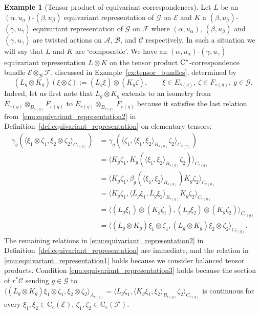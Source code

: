 \documentclass[11 pt, leqno]{amsart}
\numberwithin{equation}{section}
\theoremstyle{plain}
\theoremstyle{definition}
\newtheorem{ex}[thm]{Example}
\newcommand*{\contc}{\mathrm{C_c}}%
\newcommand{\B}{\mathcal B}
\newcommand{\G}{\mathcal G} %
\newcommand{\CC}{\mathcal C}
\newcommand{\EE}{\mathcal E}
\newcommand{\FF}{\mathcal F}
\newcommand{\A}{\mathcal A}
\newcommand{\cst}{\ifmmode\mathrm{C}^*\else{$\mathrm{C}^*$}\fi}
\begin{document}
\begin{ex}[Tensor product of equivariant correspondences] \label{ex:tensor_product_groupoid_actions}
Let $L$ be an $(\alpha, u_{\alpha})$-$(\beta,u_{\beta})$ equivariant representation of $\G$ on $\EE$  and $K$ a $(\beta,u_{\beta})$-$(\gamma, u_{\gamma})$ equivariant representation of $\G$ on $\FF$ where $(\alpha, u_{\alpha})$, $(\beta,u_{\beta})$ and $(\gamma, u_{\gamma})$ are twisted actions on  $\A$, $\B$, and  $\CC$ respectively. 
In such a situation we will say that $L$ and $K$ are `composable'. 
We have an $(\alpha, u_{\alpha})$-$(\gamma, u_{\gamma})$ equivariant representation $L \otimes K$ on the tensor product $\cst$-correspondence bundle $\EE\otimes_{\B} \FF$,
discussed in Example~\ref{ex:tensor_bundles}, determined by 
\[
    (L_g\otimes K_g )(\xi\otimes \zeta) := (L_g\xi)\otimes (K_g \zeta), \qquad \xi \in E_{s(g)},\ \zeta\in  F_{s(g)},\ g \in \G.
\]
Indeed, let us first note that $L_g\otimes K_g$ extends to an isometry from $E_{s(g)}\otimes_{B_{s(g)}} F_{s(g)}$ to $E_{r(g)}\otimes_{B_{r(g)}} F_{r(g)}$ because it satisfies the last relation from~\ref{enu:equivariant_representation2} in Definition~\ref{def:equivariant_representation} on elementary tensors:
\[
\begin{split}
    \gamma_{g}(  \langle\xi_1\otimes \zeta_1,  \xi_2\otimes \zeta_2\rangle_{C_{s(g)}}) &=\gamma_{g}(  \langle \zeta_1,  \langle \xi_1,\xi_2\rangle_{B_{s(g)}}  \zeta_2\rangle_{C_{s(g)}}) \\
    &=\langle K_{g}\zeta_1,  K_{g}(\langle \xi_1,\xi_2\rangle_{B_{s(g)}}  \zeta_2)\rangle_{C_{r(g)}}\\
    &=\langle K_{g}\zeta_1, \beta_{g}(\langle \xi_1,\xi_2\rangle_{B_{s(g)}} ) K_{g} \zeta_2\rangle_{C_{r(g)}} \\
    &=\langle K_{g}\zeta_1, \langle L_{g}\xi_1,L_{g}\xi_2\rangle_{B_{r(g)}}  K_{g} \zeta_2\rangle_{C_{r(g)}} \\
    &=\langle (L_g\xi_1)\otimes (K_g \zeta_1), (L_g\xi_2)\otimes (K_g \zeta_2) \rangle_{C_{r(g)}} \\
    &=\langle (L_g\otimes K_g )\xi_1\otimes \zeta_1, (L_g\otimes K_g )\xi_2\otimes \zeta_2 \rangle_{C_{r(g)}}.
\end{split}
\]
The remaining relations in \ref{enu:equivariant_representation2} in Definition~\ref{def:equivariant_representation} are immediate, and the relation in \ref{enu:equivariant_representation1} holds because we consider balanced tensor products.
Condition \ref{enu:equivariant_representation3} holds because the section of $ r^*\CC$ sending $g\in \G$ to $\langle (L_g\otimes K_g )\xi_1\otimes \zeta_1, \xi_2\otimes \zeta_2 \rangle_{A_{r(g)}} =\langle L_{g}\zeta_1, \langle K_{g}\xi_1,\xi_2\rangle_{B_{r(g)}}  \zeta_2\rangle_{C_{r(g)}}$ is continuous for every $\xi_1, \xi_2\in \contc(\EE)$, $\zeta_1,\zeta_2\in \contc(\FF)$.  


\end{ex}
\end{document}
